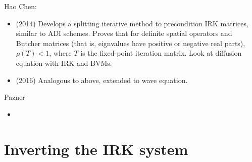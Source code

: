 \documentclass[a4paper,10pt]{article}
\begin{document}
Hao Chen:
\begin{itemize}
	\item (2014) Develops a splitting iterative method to precondition IRK matrices, similar to ADI schemes.
	Proves that for definite spatial operators and Butcher matrices (that is, eignvalues have positive
	or negative real parts), $\rho(T) < 1$, where $T$ is the fixed-point iteration matrix. Look at 
	diffusion equation with IRK and BVMs.
	\item (2016) Analogous to above, extended to wave equation.
\end{itemize}

Pazner
\begin{itemize}
	\item
\end{itemize}



\section{Inverting the IRK system}
\end{document}
